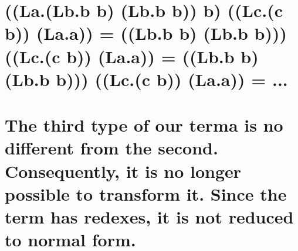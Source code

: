\documentclass{article}
\date{}
\begin{document}
\maketitle


\section{((La.(Lb.b b) (Lb.b b)) b) ((Lc.(c b)) (La.a)) =  ((Lb.b b) (Lb.b b))) ((Lc.(c b)) (La.a)) = ((Lb.b b) (Lb.b b))) ((Lc.(c b)) (La.a)) = ...}

\section{The third type of our terma is no different from the second. Consequently, it is no longer possible to transform it. Since the term has redexes, it is not reduced to normal form.}
\end{document}
